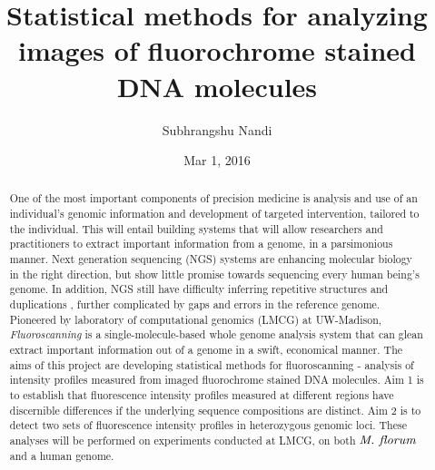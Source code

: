 \documentclass[12pt]{article}
\begin{document}
\title{Statistical methods for analyzing images of fluorochrome stained DNA molecules}
\author{Subhrangshu Nandi}
\date{Mar 1, 2016}

\maketitle

\begin{abstract}
One of the most important components of precision medicine is analysis and use of an individual's genomic information and development of targeted intervention, tailored to the individual. This will entail building systems that will allow researchers and practitioners to extract important information from a genome, in a parsimonious manner. Next generation sequencing (NGS) systems are enhancing molecular biology in the right direction, but show little promise towards sequencing every human being's genome. In addition, NGS still have difficulty inferring repetitive structures and duplications \cite{Lander_etal_2001_Nature}, further complicated by gaps and errors in the reference genome. Pioneered by laboratory of computational genomics (LMCG) at UW-Madison, {\emph{Fluoroscanning}} is a single-molecule-based whole genome analysis system that can glean extract important information out of a genome in a swift, economical manner. The aims of this project are developing statistical methods for fluoroscanning - analysis of intensity profiles measured from imaged fluorochrome stained DNA molecules. Aim 1 is to establish that fluorescence intensity profiles measured at different regions have discernible differences if the underlying sequence compositions are distinct. Aim 2 is to detect two sets of fluorescence intensity profiles in heterozygous genomic loci. These analyses will be performed on experiments conducted at LMCG, on both ${\emph{M. florum}}$ and a human genome. 
\end{abstract}



\newpage
\end{document}
